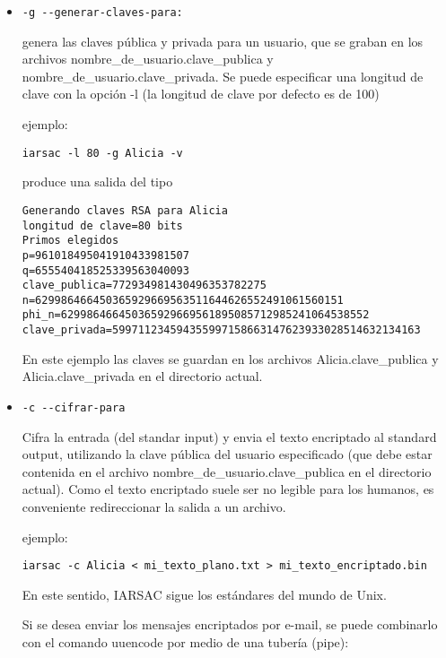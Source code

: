 \documentclass[spanish]{article}
\begin{document}
\begin{itemize}

\item

\begin{verbatim}
-g --generar-claves-para:   
\end{verbatim}

genera las claves pública y privada para un usuario, 
que se graban en los archivos nombre\_de\_usuario.clave\_publica y 
nombre\_de\_usuario.clave\_privada. Se puede especificar una longitud de clave 
con la opción -l (la longitud de clave por defecto es de 100)

ejemplo:

\begin{verbatim}
iarsac -l 80 -g Alicia -v 
\end{verbatim}

produce una salida del tipo

\begin{verbatim}
Generando claves RSA para Alicia
longitud de clave=80 bits 
Primos elegidos 
p=961018495041910433981507
q=655540418525339563040093
clave_publica=772934981430496353782275
n=629986466450365929669563511644626552491061560151
phi_n=629986466450365929669561895085712985241064538552
clave_privada=599711234594355997158663147623933028514632134163
\end{verbatim}

En este ejemplo las claves se guardan en los archivos Alicia.clave\_publica y
Alicia.clave\_privada en el directorio actual.

\item 
\begin{verbatim}
-c --cifrar-para
\end{verbatim}

Cifra la entrada (del standar input) y envia el texto encriptado al 
standard output, utilizando la clave pública del usuario especificado
(que debe estar contenida en el archivo nombre\_de\_usuario.clave\_publica en
el directorio actual). Como el texto encriptado 
suele ser no legible para los humanos, es conveniente redireccionar la salida 
a un archivo.

ejemplo:
\begin{verbatim}
iarsac -c Alicia < mi_texto_plano.txt > mi_texto_encriptado.bin
\end{verbatim}

En este sentido, IARSAC sigue los estándares del mundo de Unix.

Si se desea enviar los mensajes encriptados por e-mail, se
puede combinarlo con el comando uuencode por medio de una tubería
(pipe):


\end{itemize}
\end{document}

